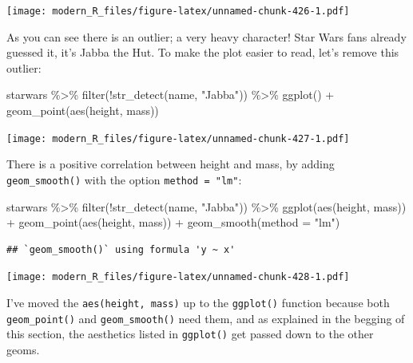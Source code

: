 \documentclass[
]{article}
\newenvironment{Shaded}{\begin{snugshade}}{\end{snugshade}}
\newcommand{\AttributeTok}[1]{\textcolor[rgb]{0.77,0.63,0.00}{#1}}
\newcommand{\FunctionTok}[1]{\textcolor[rgb]{0.00,0.00,0.00}{#1}}
\newcommand{\NormalTok}[1]{#1}
\newcommand{\SpecialCharTok}[1]{\textcolor[rgb]{0.00,0.00,0.00}{#1}}
\newcommand{\StringTok}[1]{\textcolor[rgb]{0.31,0.60,0.02}{#1}}
\begin{document}
\texttt{[image: modern\_R\_files/figure-latex/unnamed-chunk-426-1.pdf]}

As you can see there is an outlier; a very heavy character! Star Wars fans already guessed it, it's Jabba the Hut.
To make the plot easier to read, let's remove this outlier:

\begin{Shaded}
\begin{Highlighting}[]
\NormalTok{starwars }\SpecialCharTok{\%\textgreater{}\%}
  \FunctionTok{filter}\NormalTok{(}\SpecialCharTok{!}\FunctionTok{str\_detect}\NormalTok{(name, }\StringTok{"Jabba"}\NormalTok{)) }\SpecialCharTok{\%\textgreater{}\%}
  \FunctionTok{ggplot}\NormalTok{() }\SpecialCharTok{+}
    \FunctionTok{geom\_point}\NormalTok{(}\FunctionTok{aes}\NormalTok{(height, mass))}
\end{Highlighting}
\end{Shaded}

\texttt{[image: modern\_R\_files/figure-latex/unnamed-chunk-427-1.pdf]}

There is a positive correlation between height and mass, by adding \texttt{geom\_smooth()} with the option \texttt{method\ =\ "lm"}:

\begin{Shaded}
\begin{Highlighting}[]
\NormalTok{starwars }\SpecialCharTok{\%\textgreater{}\%}
  \FunctionTok{filter}\NormalTok{(}\SpecialCharTok{!}\FunctionTok{str\_detect}\NormalTok{(name, }\StringTok{"Jabba"}\NormalTok{)) }\SpecialCharTok{\%\textgreater{}\%}
  \FunctionTok{ggplot}\NormalTok{(}\FunctionTok{aes}\NormalTok{(height, mass)) }\SpecialCharTok{+}
  \FunctionTok{geom\_point}\NormalTok{(}\FunctionTok{aes}\NormalTok{(height, mass)) }\SpecialCharTok{+}
  \FunctionTok{geom\_smooth}\NormalTok{(}\AttributeTok{method =} \StringTok{"lm"}\NormalTok{)}
\end{Highlighting}
\end{Shaded}

\begin{verbatim}
## `geom_smooth()` using formula 'y ~ x'
\end{verbatim}

\texttt{[image: modern\_R\_files/figure-latex/unnamed-chunk-428-1.pdf]}

I've moved the \texttt{aes(height,\ mass)} up to the \texttt{ggplot()} function because both \texttt{geom\_point()} and \texttt{geom\_smooth()}
need them, and as explained in the begging of this section, the aesthetics listed in \texttt{ggplot()} get passed down
to the other geoms.
\end{document}
